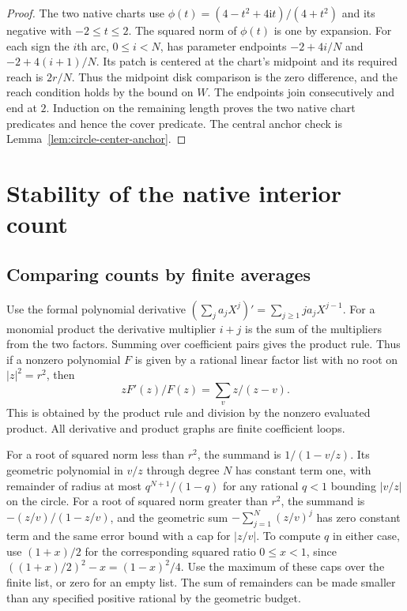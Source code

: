 \documentclass[11pt]{amsart}
\theoremstyle{definition}
\theoremstyle{remark}
\numberwithin{equation}{section}
\begin{document}
\begin{proof}
The two native charts use
$\phi(t)=(4-t^2+4\mathrm i t)/(4+t^2)$ and its
negative with $-2\le t\le2$. The squared norm of
$\phi(t)$ is one by expansion. For each sign the $i$th
arc, $0\le i<N$, has parameter endpoints
$-2+4i/N$ and $-2+4(i+1)/N$. Its patch is centered
at the chart's midpoint and its required reach is $2r/N$.
Thus the midpoint disk comparison is the zero difference,
and the reach condition holds by the bound on $W$.
The endpoints join consecutively and end at $2$.
Induction on the remaining length proves the two
native chart predicates and hence the cover predicate.
The central anchor check is Lemma~\ref{lem:circle-center-anchor}.
\end{proof}

\section{Stability of the native interior count}
\label{sec:native-count}

\subsection{Comparing counts by finite averages}

Use the formal polynomial derivative
$(\sum_j a_j X^j)'=\sum_{j\ge1}j a_j X^{j-1}$.
For a monomial product the derivative multiplier $i+j$
is the sum of the multipliers from the two factors.
Summing over coefficient pairs gives the product rule.
Thus if a nonzero polynomial $F$
is given by a rational linear factor list with no root on
$|z|^2=r^2$, then
\[
      zF'(z)/F(z)=\sum_v z/(z-v).
\]
This is obtained by the product rule and division by
the nonzero evaluated product. All derivative and
product graphs are finite coefficient loops.

For a root of squared norm less than $r^2$, the summand
is $1/(1-v/z)$. Its geometric polynomial in $v/z$
through degree $N$ has constant term one, with remainder
of radius at most $q^{N+1}/(1-q)$ for any rational
$q<1$ bounding $|v/z|$ on the circle.
For a root of squared norm greater than $r^2$, the
summand is $-(z/v)/(1-z/v)$, and the geometric sum
$-\sum_{j=1}^N(z/v)^j$ has zero constant term and the
same error bound with a cap for $|z/v|$.
To compute $q$ in either case, use $(1+x)/2$ for the
corresponding squared ratio $0\le x<1$, since
$((1+x)/2)^2-x=(1-x)^2/4$. Use the maximum of
these caps over the finite list, or zero for an empty list.
The sum of remainders can be made smaller than any
specified positive rational by the geometric budget.
\end{document}
